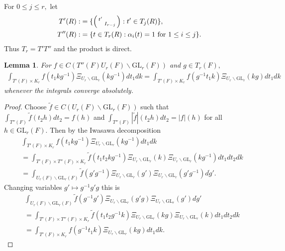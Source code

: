 \documentclass[12pt]{amsart}
\newtheorem{lem}[thm]{Lemma}
\theoremstyle{remark}
\numberwithin{equation}{section}
\newcommand{\GL}{\mathrm{GL}}
\theoremstyle{definition}
\newenvironment{psmatrix}
  {\left(\begin{smallmatrix}}
  {\end{smallmatrix}\right)}
\numberwithin{equation}{subsection}
\begin{document}
For $0 \leq j \leq r,$ let
\begin{align*} \begin{split}
T'(R):&=\{ \begin{psmatrix} t' & \\ & I_{r-j}\end{psmatrix}:t' \in T_{j}(R)\},\\
T''(R):&=\{t \in T_r(R): \alpha_i(t)=1\textrm{ for }1 \leq i \leq j\}. \end{split}
\end{align*}
Thus $T_r=T'T''$ and the product is direct.
\begin{lem} \label{lem:COV}
For $f \in C(T''(F)U_r(F) \backslash \GL_r(F))$ and   $g \in T_r(F),$ 
\begin{align*}
\int_{T'(F) \times  K_r}f(t_1kg^{-1})\Xi_{U_r \backslash \GL_r}(kg^{-1})dt_1dk=\int_{T'(F) \times K_r}f(g^{-1}t_1k)\Xi_{U_r \backslash \GL_r}(kg)dt_1dk
\end{align*}
whenever the integrals converge absolutely.  
\end{lem}

\begin{proof}
Choose $\widetilde{f} \in C(U_r(F) \backslash \GL_r(F))$ such that $\int_{T''(F)}\widetilde{f}(t_2h)dt_2=f(h)$ and $\int_{T''(F)}|\widetilde{f}|(t_2h)dt_2=|f|(h)$ for all $h \in \GL_r(F).$   Then by the Iwasawa decomposition
\begin{align*}
    &\int_{T'(F) \times  K_r}f(t_1kg^{-1})\Xi_{U_r \backslash \GL_r}(kg^{-1})dt_1dk\\&=\int_{T'(F) \times T''(F) \times  K_r}\widetilde{f}(t_1t_2kg^{-1})\Xi_{U_r \backslash \GL_r}(k)\Xi_{U_r \backslash \GL_r}(kg^{-1})dt_1dt_2dk\\
    &=\int_{U_r(F) \backslash \GL_r(F)}\widetilde{f}(g'g^{-1})\Xi_{U_r \backslash \GL_r}(g')\Xi_{U_r \backslash \GL_r}(g'g^{-1})d\dot{g}'.
\end{align*}
Changing variables $g' \mapsto g^{-1}g'g$ this is 
\begin{align*}
    &\int_{U_r(F) \backslash \GL_r(F)}\widetilde{f}(g^{-1}g')\Xi_{U_r \backslash \GL_r}(g'g)\Xi_{U_r \backslash \GL_r}(g')d\dot{g}'\\
    &=\int_{T'(F) \times T''(F) \times  K_r}\widetilde{f}(t_1t_2g^{-1}k)\Xi_{U_r \backslash \GL_r}(kg)\Xi_{U_r \backslash \GL_r}(k)dt_1dt_2dk\\
    &=\int_{T'(F) \times K_r}f(g^{-1}t_1k)\Xi_{U_r \backslash \GL_r}(kg)dt_1dk.
\end{align*}
\end{proof}
\end{document}
